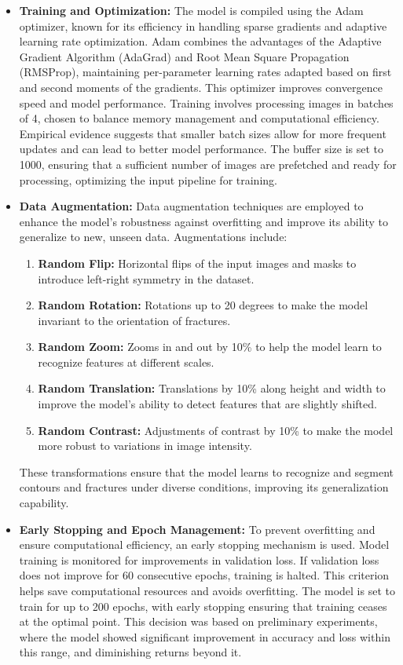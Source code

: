 \documentclass[preprint,12pt]{elsarticle}
\begin{document}
\begin{itemize}
    \item \textbf{Training and Optimization:} The model is compiled using the Adam optimizer, known for its efficiency in handling sparse gradients and adaptive learning rate optimization. Adam combines the advantages of the Adaptive Gradient Algorithm (AdaGrad) and Root Mean Square Propagation (RMSProp), maintaining per-parameter learning rates adapted based on first and second moments of the gradients. This optimizer improves convergence speed and model performance. Training involves processing images in batches of 4, chosen to balance memory management and computational efficiency. Empirical evidence suggests that smaller batch sizes allow for more frequent updates and can lead to better model performance. The buffer size is set to 1000, ensuring that a sufficient number of images are prefetched and ready for processing, optimizing the input pipeline for training.

    \item \textbf{Data Augmentation:} Data augmentation techniques are employed to enhance the model's robustness against overfitting and improve its ability to generalize to new, unseen data. Augmentations include:
        \begin{enumerate}
            \item \textbf{Random Flip:} Horizontal flips of the input images and masks to introduce left-right symmetry in the dataset.
            \item \textbf{Random Rotation:} Rotations up to 20 degrees to make the model invariant to the orientation of fractures.
            \item \textbf{Random Zoom:} Zooms in and out by 10\% to help the model learn to recognize features at different scales.
            \item \textbf{Random Translation:} Translations by 10\% along height and width to improve the model’s ability to detect features that are slightly shifted.
            \item \textbf{Random Contrast:} Adjustments of contrast by 10\% to make the model more robust to variations in image intensity.
        \end{enumerate}
        These transformations ensure that the model learns to recognize and segment contours and fractures under diverse conditions, improving its generalization capability.

    \item \textbf{Early Stopping and Epoch Management:} To prevent overfitting and ensure computational efficiency, an early stopping mechanism is used. Model training is monitored for improvements in validation loss. If validation loss does not improve for 60 consecutive epochs, training is halted. This criterion helps save computational resources and avoids overfitting. The model is set to train for up to 200 epochs, with early stopping ensuring that training ceases at the optimal point. This decision was based on preliminary experiments, where the model showed significant improvement in accuracy and loss within this range, and diminishing returns beyond it.



\end{itemize}
\end{document}
